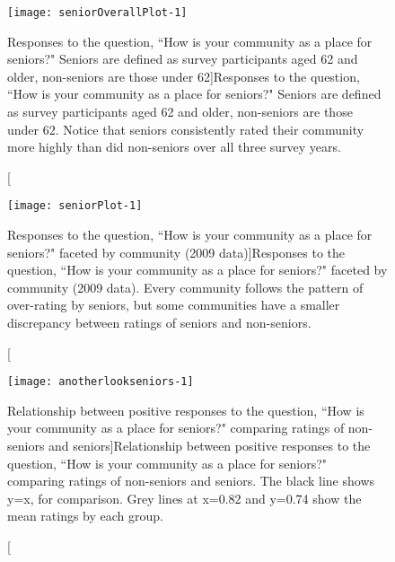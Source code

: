 \documentclass[smallextended]{svjour3}\usepackage[]{graphicx}\usepackage[]{color}
\newenvironment{knitrout}{}{} %
\begin{document}
\begin{knitrout}
\color{fgcolor}\begin{figure}

{\centering \texttt{[image: seniorOverallPlot-1]} 

}

\caption[Responses to the question, ``How is your community as a place for seniors?" Seniors are defined as survey participants aged 62 and older, non-seniors are those under 62]{Responses to the question, ``How is your community as a place for seniors?" Seniors are defined as survey participants aged 62 and older, non-seniors are those under 62. Notice that seniors consistently rated their community more highly than did non-seniors over all three survey years.}\label{fig:seniorOverallPlot}
\end{figure}


\end{knitrout}

\begin{knitrout}
\color{fgcolor}\begin{figure}

{\centering \texttt{[image: seniorPlot-1]} 

}

\caption[Responses to the question, ``How is your community as a place for seniors?" faceted by community (2009 data)]{Responses to the question, ``How is your community as a place for seniors?" faceted by community (2009 data). Every community follows the pattern of over-rating by seniors, but some communities have a smaller discrepancy between ratings of seniors and non-seniors.}\label{fig:seniorPlot}
\end{figure}


\end{knitrout}


\begin{knitrout}
\color{fgcolor}\begin{figure}

{\centering \texttt{[image: anotherlookseniors-1]} 

}

\caption[Relationship between positive responses to the question, ``How is your community as a place for seniors?" comparing ratings of non-seniors and seniors]{Relationship between positive responses to the question, ``How is your community as a place for seniors?" comparing ratings of non-seniors and seniors. The black line shows y=x, for comparison. Grey lines at x=0.82 and y=0.74 show the mean ratings by each group.}\label{fig:anotherlookseniors}
\end{figure}


\end{knitrout}
\end{document}
